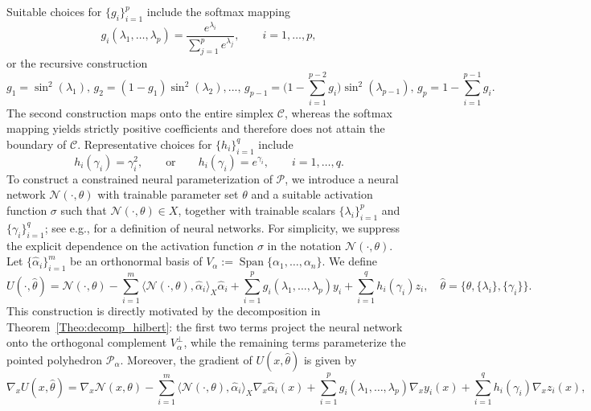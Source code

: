 \documentclass{article}
\numberwithin{equation}{section}
\begin{document}
Suitable choices for $\{g_i\}_{i=1}^p$ include the softmax mapping
\begin{equation}
    g_i(\lambda_1,\dots,\lambda_p)
    =
    \frac{e^{\lambda_i}}{\sum_{j=1}^p e^{\lambda_j}},
    \qquad i=1,\dots,p,
\end{equation}
or the recursive construction
\begin{equation}
    g_1 = \sin^2(\lambda_1),\, g_2=(1-g_1)\sin^2(\lambda_2),...,\,g_{p-1}=\big(1-\sum_{i=1}^{p-2}g_i\big)\sin^2(\lambda_{p-1}),\,g_p = 1-\sum_{i=1}^{p-1}g_i.
\end{equation}
The second construction maps onto the entire simplex $\mathcal{C}$, whereas the softmax mapping yields strictly positive coefficients and therefore does not attain the boundary of $\mathcal{C}$. Representative choices for $\{h_i\}_{i=1}^q$ include
\begin{equation}
    h_i(\gamma_i)=\gamma_i^2,
    \qquad\text{or}\qquad
    h_i(\gamma_i)=e^{\gamma_i},
    \qquad i=1,\dots,q.
\end{equation}
To construct a constrained neural parameterization of $\mathcal{P}$, we introduce a neural network $\mathcal{N}(\cdot,\theta)$ with trainable parameter set $\theta$ and a suitable activation function $\sigma$ such that $\mathcal{N}(\cdot,\theta)\in X$, together with trainable scalars $\{\lambda_i\}_{i=1}^p$ and $\{\gamma_i\}_{i=1}^q$; see e.g., \cite{lecun2015deep} for a definition of neural networks.  For simplicity, we suppress the explicit dependence on the activation function $\sigma$ in the notation $\mathcal{N}(\cdot,\theta)$. Let $\{\hat{\alpha}_i\}_{i=1}^m$ be an orthonormal basis of $V_\alpha:=\operatorname{Span}\{\alpha_1,\dots,\alpha_n\}$. We define
\begin{equation}\label{equa:CNP_polyhedra}
     U(\cdot,\hat{\theta})=\mathcal{N}(\cdot,\theta)-\sum_{i=1}^m \langle \mathcal{N}(\cdot,\theta),\hat{\alpha}_i\rangle_X\hat{\alpha}_i+ \sum_{i=1}^p g_i(\lambda_1,...,\lambda_p) y_i + \sum_{i=1}^q h_i(\gamma_i) z_i,\quad \hat{\theta} = \{\theta, \{\lambda_i\},\{\gamma_i\}\}.
\end{equation}
This construction is directly motivated by the decomposition in Theorem~\ref{Theo:decomp_hilbert}: the first two terms project the neural network onto the orthogonal complement $V_\alpha^\perp$, while the remaining terms parameterize the pointed polyhedron $\mathcal{P}_\alpha$. Moreover, the gradient of $U(x,\hat{\theta})$ is given by
\begin{equation}
   \nabla_x U(x,\hat{\theta})=
   \nabla_x \mathcal{N}(x,\theta)
   -
   \sum_{i=1}^m \langle \mathcal{N}(\cdot,\theta),\hat{\alpha}_i\rangle_X \nabla_x \hat{\alpha}_i(x)
   +
   \sum_{i=1}^p g_i(\lambda_1,\dots,\lambda_p)\nabla_x y_i(x)
   +
   \sum_{i=1}^q h_i(\gamma_i)\nabla_x z_i(x),
\end{equation}
\end{document}
